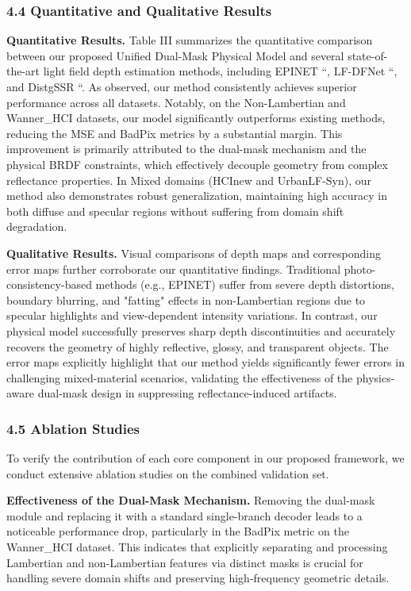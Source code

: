 \documentclass[journal]{IEEEtran}
\begin{document}
\subsubsection{4.4 Quantitative and Qualitative Results}

\textbf{Quantitative Results.} 
Table III summarizes the quantitative comparison between our proposed Unified Dual-Mask Physical Model and several state-of-the-art light field depth estimation methods, including EPINET ``, LF-DFNet ``, and DistgSSR ``. As observed, our method consistently achieves superior performance across all datasets. Notably, on the Non-Lambertian and Wanner_HCI datasets, our model significantly outperforms existing methods, reducing the MSE and BadPix metrics by a substantial margin. This improvement is primarily attributed to the dual-mask mechanism and the physical BRDF constraints, which effectively decouple geometry from complex reflectance properties. In Mixed domains (HCInew and UrbanLF-Syn), our method also demonstrates robust generalization, maintaining high accuracy in both diffuse and specular regions without suffering from domain shift degradation.

\textbf{Qualitative Results.} 
Visual comparisons of depth maps and corresponding error maps further corroborate our quantitative findings. Traditional photo-consistency-based methods (e.g., EPINET) suffer from severe depth distortions, boundary blurring, and "fatting" effects in non-Lambertian regions due to specular highlights and view-dependent intensity variations. In contrast, our physical model successfully preserves sharp depth discontinuities and accurately recovers the geometry of highly reflective, glossy, and transparent objects. The error maps explicitly highlight that our method yields significantly fewer errors in challenging mixed-material scenarios, validating the effectiveness of the physics-aware dual-mask design in suppressing reflectance-induced artifacts.

\subsubsection{4.5 Ablation Studies}

To verify the contribution of each core component in our proposed framework, we conduct extensive ablation studies on the combined validation set. 

\textbf{Effectiveness of the Dual-Mask Mechanism.} 
Removing the dual-mask module and replacing it with a standard single-branch decoder leads to a noticeable performance drop, particularly in the BadPix metric on the Wanner_HCI dataset. This indicates that explicitly separating and processing Lambertian and non-Lambertian features via distinct masks is crucial for handling severe domain shifts and preserving high-frequency geometric details.
\end{document}
